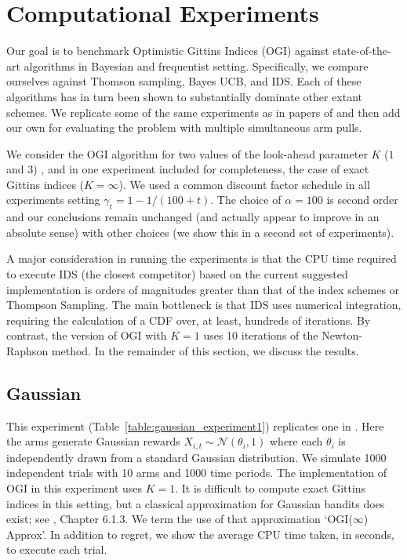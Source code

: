 \section{Computational Experiments} \label{sec:experiments}
Our goal is to benchmark Optimistic Gittins Indices (OGI) against state-of-the-art algorithms in Bayesian and frequentist setting. Specifically, we compare ourselves against Thomson sampling, Bayes UCB, and IDS. Each of these algorithms has in turn been shown to substantially dominate other extant schemes. We replicate some of the same experiments as in papers of \cite{russo2014learning,kaufmann2012thompson} and then add our own for evaluating the problem with multiple simultaneous arm pulls.  

We consider the OGI algorithm for two values of the look-ahead parameter $K$ ($1$ and $3$) , and in one experiment included for completeness, the case of exact Gittins indices ($K=\infty$). We used a common discount factor schedule in all experiments setting $\gamma_t = 1 - 1/(100 + t)$. The choice of $\alpha = 100$ is second order and our conclusions remain unchanged (and actually appear to improve in an absolute sense) with other choices (we show this in a second set of experiments). 

A major consideration in running the experiments is that the CPU time required to execute IDS (the closest competitor) based on the current suggested implementation is orders of magnitudes greater than that of the index schemes or Thompson Sampling. The main bottleneck is that IDS uses numerical integration,  requiring the calculation of a CDF over, at least, hundreds of iterations. By contrast, the version of OGI with $K=1$ uses 10 iterations of the Newton-Raphson method. In the remainder of this section, we discuss the results.

\subsection{Gaussian}
This experiment (Table~\ref{table:gaussian_experiment1}) replicates one in \cite{russo2014learning}. Here the arms generate Gaussian rewards  $X_{i,t} \sim \mathcal{N}(\theta_i, 1)$ where each $\theta_i$ is independently drawn from a standard Gaussian distribution. We simulate 1000 independent trials with 10 arms and 1000 time periods. The implementation of OGI in this experiment uses $K = 1$. It is difficult to compute exact Gittins indices in this setting, but a classical approximation for Gaussian bandits does exist; see \cite{powell2012optimal}, Chapter 6.1.3. We term the use of that approximation `OGI($\infty$) Approx'.  In addition to regret, we  show the average CPU time taken, in seconds, to execute each trial.

